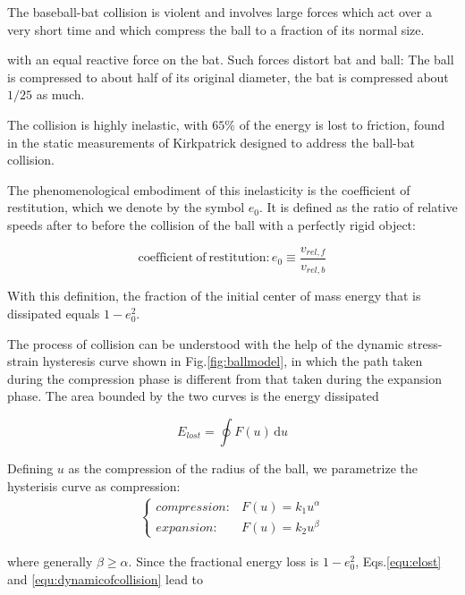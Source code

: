 \documentclass[12pt]{article}
\newcommand{\dd}{\ensuremath{\,\mathrm{d}}}
\begin{document}
The baseball-bat collision is violent and involves large forces
which act over a very short time and which compress the ball to a fraction of its normal size.

with an equal reactive force on the bat.
Such forces distort bat and ball: The ball is compressed to about  half of its original diameter,
the bat is compressed about $1/25$ as much\cite{K.Adair2002}.

The collision is highly inelastic, with $65\%$ of the energy is lost to friction,
found in the static measurements of Kirkpatrick designed to address the ball-bat collision\cite{Kirkpatrick1963}.

The phenomenological embodiment of this inelasticity is the coefficient of restitution,
which we denote by the symbol $e_0$.
It is defined as the ratio of relative speeds after to before
the collision of the ball with a perfectly rigid object:

\begin{equation}
\mathrm{coefficient\ of\  restitution}:e_0\equiv \frac{v_{rel,f}}{v_{rel,b}}
\end{equation}

With this definition, the fraction of the initial center of mass energy that is dissipated equals $1-e_0^2$.



The process of collision can be understood with the
help of the dynamic stress-strain hysteresis curve shown in
Fig.\ref{fig:ballmodel},
in which the path taken during the compression phase
is different from that taken during the expansion phase. The area bounded by the two curves is the energy dissipated

\begin{equation}
E_{lost}=\oint F(u)\dd u \label{equ:elost}
\end{equation}

Defining $u$ as the compression of the radius of the ball, we parametrize the hysterisis curve as compression:
\begin{eqnarray}
\left\{
\begin{array}{ll}
compression:&F(u)=k_1 u^\alpha \\
expansion:&F(u)=k_2 u^\beta
\end{array}\right.\label{equ:dynamicofcollision}
\end{eqnarray}

where generally $\beta \geq \alpha$.
Since the fractional energy loss is $1-e_0^2$,
 Eqs.\ref{equ:elost} and \ref{equ:dynamicofcollision}
 lead to
\end{document}
